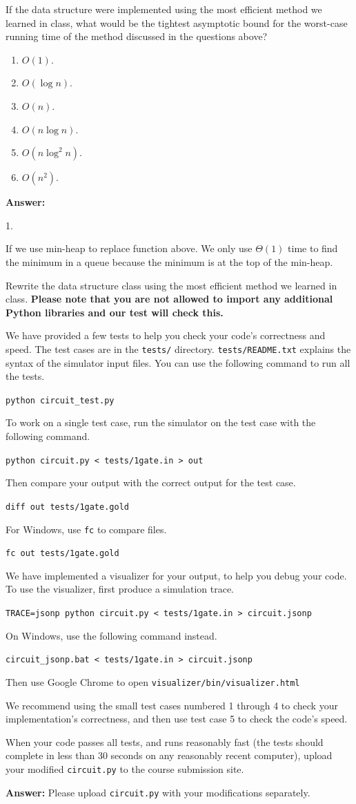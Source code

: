 \documentclass[12pt,twoside]{article}
\newcommand{\answer}{
 \par\medskip
 \textbf{Answer:}
}
\newcommand{\answerIId}{ \answer
{\color{blue}1.

If we use min-heap to replace function above. We only use $\Theta (1)$ time 
to find the minimum in a queue because the minimum is at the top of 
the min-heap.

}
}
\begin{document}
\begin{problems}
\begin{problemparts}
\problempart {} If the data structure were implemented using the most
efficient method we learned in class, what would be the tightest asymptotic
bound for the worst-case running time of the method discussed in the questions
above?
\begin{enumerate}
  \item $O(1)$.
  \item $O(\log n)$.
  \item $O(n)$.
  \item $O(n \log n)$.
  \item $O(n \log^2 n)$.
  \item $O(n^2)$.
\end{enumerate}
\answerIId

\problempart {} Rewrite the data structure class using the most
efficient method we learned in class. \textbf{Please note that you are not
allowed to import any additional Python libraries and our test will check this.}

We have provided a few tests to help you check your code's correctness and
speed. The test cases are in the \texttt{tests/} directory.
\texttt{tests/README.txt} explains the syntax of the simulator input files. You
can use the following command to run all the tests.

\texttt{python circuit\_test.py}

To work on a single test case, run the simulator on the test case with the
following command.

\texttt{python circuit.py < tests/1gate.in > out}

Then compare your output with the correct output for the test case.

\texttt{diff out tests/1gate.gold}

For Windows, use \texttt{fc} to compare files.

\texttt{fc out tests/1gate.gold}

We have implemented a visualizer for your output, to help you debug your code.
To use the visualizer, first produce a simulation trace.

\texttt{TRACE=jsonp python circuit.py < tests/1gate.in > circuit.jsonp}

On Windows, use the following command instead.

\texttt{circuit\_jsonp.bat < tests/1gate.in > circuit.jsonp}

Then use Google Chrome to open
\texttt{visualizer/bin/visualizer.html}

We recommend using the small test cases numbered 1 through 4 to check your
implementation's correctness, and then use test case 5 to check the code's
speed.

When your code passes all tests, and runs reasonably fast (the tests should
complete in less than 30 seconds on any reasonably recent computer), upload your
modified \texttt{circuit.py} to the course submission site.

\answer {
  Please upload \texttt{circuit.py} with your modifications separately.
}

\end{problemparts}

\end{problems}
\end{document}
